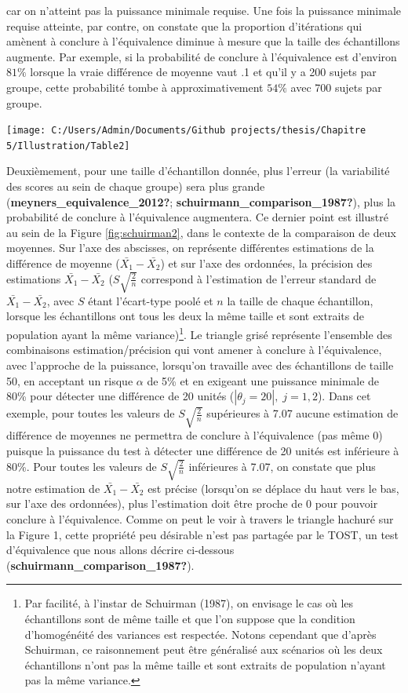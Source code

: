 \documentclass[
  english,
  man]{apa6}
\begin{document}
car on n'atteint pas la puissance minimale requise. Une fois la puissance minimale requise atteinte, par contre, on constate que la proportion d'itérations qui amènent à conclure à l'équivalence diminue à mesure que la taille des échantillons augmente. Par exemple, si la probabilité de conclure à l'équivalence est d'environ \(81 \%\) lorsque la vraie différence de moyenne vaut .1 et qu'il y a 200 sujets par groupe, cette probabilité tombe à approximativement \(54\%\) avec 700 sujets par groupe.

\begin{flushleft}\texttt{[image: C:/Users/Admin/Documents/Github projects/thesis/Chapitre 5/Illustration/Table2]} \end{flushleft}

Deuxièmement, pour une taille d'échantillon donnée, plus l'erreur (la variabilité des scores au sein de chaque groupe) sera plus grande (\textbf{meyners\_equivalence\_2012?}; \textbf{schuirmann\_comparison\_1987?}), plus la probabilité de conclure à l'équivalence augmentera. Ce dernier point est illustré au sein de la Figure \ref{fig:schuirman2}, dans le contexte de la comparaison de deux moyennes. Sur l'axe des abscisses, on représente différentes estimations de la différence de moyenne (\(\bar{X_1}-\bar{X_2}\)) et sur l'axe des ordonnées, la précision des estimations \(\bar{X_1}-\bar{X_2}\) (\(S\sqrt{\frac{2}{n}}\) correspond à l'estimation de l'erreur standard de \(\bar{X_1}-\bar{X_2}\), avec \(S\) étant l'écart-type poolé et \(n\) la taille de chaque échantillon, lorsque les échantillons ont tous les deux la même taille et sont extraits de population ayant la même variance)\footnote{Par facilité, à l'instar de Schuirman (1987), on envisage le cas où les échantillons sont de même taille et que l'on suppose que la condition d'homogénéité des variances est respectée. Notons cependant que d'après Schuirman, ce raisonnement peut être généralisé aux scénarios où les deux échantillons n'ont pas la même taille et sont extraits de population n'ayant pas la même variance.}. Le triangle grisé représente l'ensemble des combinaisons estimation/précision qui vont amener à conclure à l'équivalence, avec l'approche de la puissance, lorsqu'on travaille avec des échantillons de taille 50, en acceptant un risque \(\alpha\) de 5\% et en exigeant une puissance minimale de 80\% pour détecter une différence de 20 unités (\(|\theta_j=20|,\;j=1,2\)). Dans cet exemple, pour toutes les valeurs de \(S\sqrt{\frac{2}{n}}\) supérieures à 7.07 aucune estimation de différence de moyennes ne permettra de conclure à l'équivalence (pas même 0) puisque la puissance du test à détecter une différence de 20 unités est inférieure à 80\%. Pour toutes les valeurs de \(S\sqrt{\frac{2}{n}}\) inférieures à 7.07, on constate que plus notre estimation de \(\bar{X_1}-\bar{X_2}\) est précise (lorsqu'on se déplace du haut vers le bas, sur l'axe des ordonnées), plus l'estimation doit être proche de 0 pour pouvoir conclure à l'équivalence. Comme on peut le voir à travers le triangle hachuré sur la Figure 1, cette propriété peu désirable n'est pas partagée par le TOST, un test d'équivalence que nous allons décrire ci-dessous (\textbf{schuirmann\_comparison\_1987?}).
\end{document}
